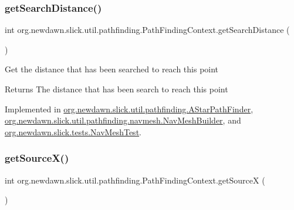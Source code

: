 \subsubsection{\texorpdfstring{get\+Search\+Distance()}{getSearchDistance()}}
{\footnotesize\ttfamily int org.\+newdawn.\+slick.\+util.\+pathfinding.\+Path\+Finding\+Context.\+get\+Search\+Distance (\begin{DoxyParamCaption}{ }\end{DoxyParamCaption})}

Get the distance that has been searched to reach this point

\begin{DoxyReturn}{Returns}
The distance that has been search to reach this point 
\end{DoxyReturn}


Implemented in \mbox{\hyperlink{classorg_1_1newdawn_1_1slick_1_1util_1_1pathfinding_1_1_a_star_path_finder_abf095f4193d79acc42fdceb293468e14}{org.\+newdawn.\+slick.\+util.\+pathfinding.\+A\+Star\+Path\+Finder}}, \mbox{\hyperlink{classorg_1_1newdawn_1_1slick_1_1util_1_1pathfinding_1_1navmesh_1_1_nav_mesh_builder_ad5148985f384f4fd0a1bc61ad92c7ea9}{org.\+newdawn.\+slick.\+util.\+pathfinding.\+navmesh.\+Nav\+Mesh\+Builder}}, and \mbox{\hyperlink{classorg_1_1newdawn_1_1slick_1_1tests_1_1_nav_mesh_test_ada8b9e7b14d4ca0de9094cd67f0ec9bf}{org.\+newdawn.\+slick.\+tests.\+Nav\+Mesh\+Test}}.

\mbox{\label{interfaceorg_1_1newdawn_1_1slick_1_1util_1_1pathfinding_1_1_path_finding_context_a7b67cdc7d0eaf54e6e07d09b1a575065}} 
\subsubsection{\texorpdfstring{get\+Source\+X()}{getSourceX()}}
{\footnotesize\ttfamily int org.\+newdawn.\+slick.\+util.\+pathfinding.\+Path\+Finding\+Context.\+get\+SourceX (\begin{DoxyParamCaption}{ }\end{DoxyParamCaption})}

